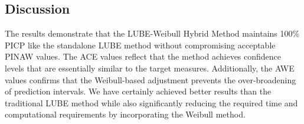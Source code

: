 \begin{table}[!t]
\caption{Performance of LUBE-Weibull Hybrid Method on Web Traffic dataset.}
\vspace{0.5cm}
\renewcommand{\arraystretch}{1} %
\label{Table 3.5}
\end{table}
\clearpage

\subsection{Discussion}
The results demonstrate that the LUBE-Weibull Hybrid Method maintains 100\% PICP like the standalone LUBE method without compromising acceptable PINAW values. The ACE values reflect that the method achieves confidence levels that are essentially similar to the target measures. Additionally, the AWE values confirms that the Weibull-based adjustment prevents the over-broadening of prediction intervals.
We have certainly achieved better results than the traditional LUBE method while also significantly reducing the required time and computational requirements by incorporating the Weibull method.

